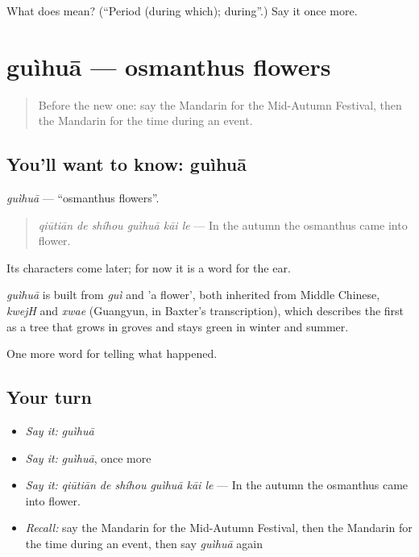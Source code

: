 \begin{tcolorbox}[breakable,colback=teal!4,colframe=teal!35!black,title={Before you move on}]
What does  mean? (\textquotedblleft{}Period (during which); during\textquotedblright{}.) Say it once more.
\end{tcolorbox}
\section[guìhuā]{guìhuā — osmanthus flowers}

\label{lesson:ZH-C342-guihua}



\begin{quote}
Before the new one: say the Mandarin for the Mid-Autumn Festival, then the Mandarin for the time during an event.
\end{quote}

\subsection*{You'll want to know: guìhuā}
\emph{guìhuā} — \textquotedblleft{}osmanthus flowers\textquotedblright{}.

\begin{quote}
\emph{qiūtiān de shíhou guìhuā kāi le} — In the autumn the osmanthus came into flower.
\end{quote}

Its characters come later; for now it is a word for the ear.

\begin{cousinweb}
\emph{guìhuā} is built from \emph{guì} and  'a flower', both inherited from Middle Chinese, \emph{kwejH} and \emph{xwae} (Guangyun, in Baxter's transcription), which describes the first as a tree that grows in groves and stays green in winter and summer.
\end{cousinweb}

\begin{grammarlens}[title={What you've built}]
One more word for telling what happened.
\end{grammarlens}

\subsection*{Your turn}
\begin{itemize}
\raggedright
  \item \emph{Say it:} \emph{guìhuā}
  \item \emph{Say it:} \emph{guìhuā}, once more
  \item \emph{Say it:} \emph{qiūtiān de shíhou guìhuā kāi le} — In the autumn the osmanthus came into flower.
  \item \emph{Recall:} say the Mandarin for the Mid-Autumn Festival, then the Mandarin for the time during an event, then say \emph{guìhuā} again
\end{itemize}

